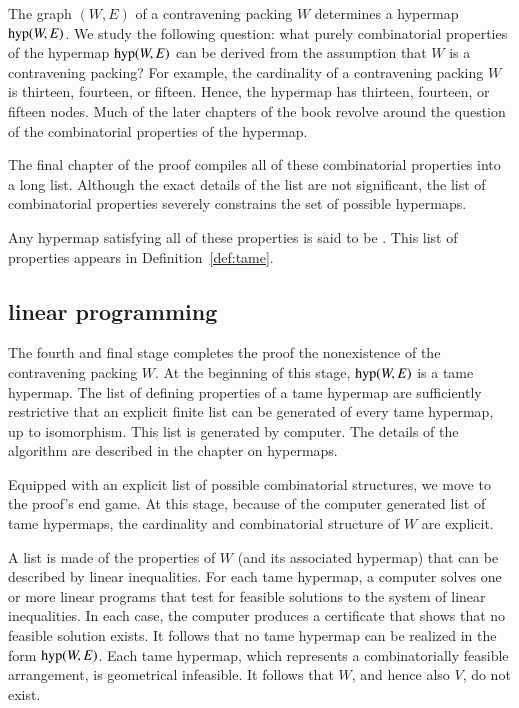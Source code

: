 The graph $(W,E)$ of a contravening packing $W$ determines a hypermap
${\operatorname{hyp}}(W,E)$. We study the following question: what  purely
combinatorial properties of the hypermap ${\operatorname{hyp}}(W,E)$ can be derived from
the assumption  that
$W$ is a contravening packing?  For example, the cardinality of a
contravening packing $W$ is thirteen, fourteen, or fifteen.  Hence, the hypermap
has thirteen, fourteen, or fifteen nodes.  Much of the later chapters of the book
revolve around the question of the combinatorial properties of the
hypermap.

The final chapter of the proof compiles all of these combinatorial
properties into a long list.  
Although the exact details of the list are not significant,
the list of combinatorial properties severely constrains the set of possible
hypermaps.  

Any hypermap satisfying all of these properties is said to be
.  This list of properties appears in
Definition~\ref{def:tame}.


\subsection{linear programming}

The fourth and final stage completes the proof the nonexistence of
the contravening packing $W$.  At the beginning of this stage,
${\operatorname{hyp}}(W,E)$ is a tame hypermap.  The list of defining properties
of a tame hypermap are sufficiently restrictive that an explicit finite
list can be generated of every tame hypermap, up to isomorphism.  
This list is generated by computer.  The details of the algorithm are
described in the chapter on hypermaps.

Equipped with an explicit list of possible combinatorial structures,
we move to the proof's end game.  At this stage, because of the computer
generated list of tame hypermaps, the cardinality and
combinatorial structure of $W$ are explicit.

A list is made of the properties of $W$ (and its associated hypermap)
that can be described by linear inequalities.  For each tame hypermap,
a computer solves one or more linear programs that test for feasible
solutions to the system of linear inequalities.  In each case, the
computer produces a certificate that shows that no feasible solution
exists.  It follows that no tame hypermap can be realized in the form
${\operatorname{hyp}}(W,E)$.  Each tame hypermap, which represents a
combinatorially feasible arrangement, is geometrical infeasible.  It
follows that $W$, and hence also $V$, do not exist.

